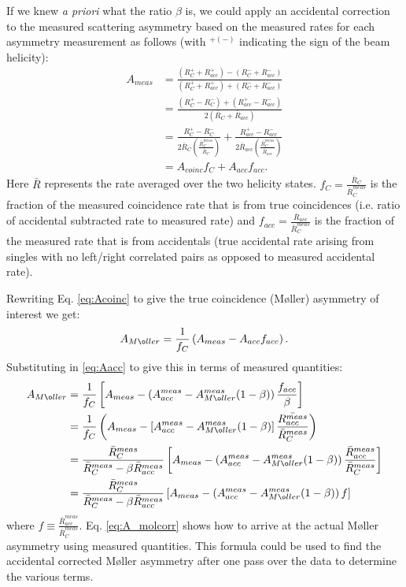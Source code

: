 \documentclass[12pt]{article}
\begin{document}
If we knew {\it a priori} what the ratio $\beta$ is, we could apply an accidental correction to the measured scattering asymmetry based on the measured rates for each asymmetry measurement as follows (with $^{+(-)}$ indicating the sign of the beam helicity):
\begin{align}
A_{meas}&=\frac{(R_C^{+}+R_{acc}^{+})-(R_C^{-}+R_{acc}^{-})}{(R_C^{+}+R_{acc}^{+})+(R_C^{-}+R_{acc}^{-})}\label{eq:Araw}\\
&=\frac{(R_C^{+}-R_{C}^{-})+(R_{acc}^{+}-R_{acc}^{-})}{2(\bar{R}_C+\bar{R}_{acc})}\\
&=\frac{R_C^{+}-R_{C}^{-}}{2\bar{R}_C\left(\frac{\bar{R}_C^{meas}}{\bar{R}_C}\right)}+\frac{R_{acc}^{+}- R_{acc}^{-}}{2\bar{R}_{acc}\left(\frac{\bar{R}_C^{meas}}{\bar{R}_{acc}}\right)}\\
&=A_{coinc}f_C+A_{acc}f_{acc}.\label{eq:Acoinc}
\end{align}
Here $\bar{R}$ represents the rate averaged over the two helicity states. $f_C=\frac{\bar{R}_C}{\bar{R}_C^{meas}}$ is the fraction of the measured coincidence rate that is from true coincidences (i.e. ratio of accidental subtracted rate to measured rate) and $f_{acc}=\frac{\bar{R}_{acc}}{\bar{R}_C^{meas}}$ is the fraction of the measured rate that is from accidentals (true accidental rate arising from singles with no left/right correlated pairs as opposed to measured accidental rate).

Rewriting Eq. \ref{eq:Acoinc} to give the true coincidence (M\o ller) asymmetry of interest we get:
\[
A_{M\o ller}=\frac{1}{f_C}\left(A_{meas}-A_{acc}f_{acc}\right).
\]
Substituting in \ref{eq:Aacc} to give this in terms of measured quantities:
\begin{align}
A_{M\o ller}&=\frac{1}{f_C}\left[A_{meas}-\left(A_{acc}^{meas}-A_{M\o ller}^{meas}(1-\beta)\right)\frac{f_{acc}}{\beta}\right]\\
&=\frac{1}{f_C}\left(A_{meas}-\left[A_{acc}^{meas}-A_{M\o ller}^{meas}(1-\beta)\right]\frac{\bar{R_{acc}^{meas}}}{\bar{R}_C^{meas}}\right)\\
&=\frac{\bar{R}_C^{meas}}{\bar{R}_C^{meas}-\beta\bar{R}_{acc}^{meas}}\left[A_{meas}-\left(A_{acc}^{meas}-A_{M\o ller}^{meas}(1-\beta)\right)\frac{\bar{R}_{acc}^{meas}}{\bar{R}_C^{meas}}\right]\\
&=\frac{\bar{R}_C^{meas}}{\bar{R}_C^{meas}-\beta\bar{R}_{acc}^{meas}}\left[A_{meas}-\left(A_{acc}^{meas}-A_{M\o ller}^{meas}(1-\beta)\right)f\right]\label{eq:A_molcorr}
\end{align}
where $f\equiv\frac{\bar{R}_{acc}^{meas}}{\bar{R}_C^{meas}}$. Eq. \ref{eq:A_molcorr} shows how to arrive at the actual M\o ller asymmetry using measured quantities. This formula could be used to find the accidental corrected M\o ller asymmetry after one pass over the data to determine the various terms. 
\end{document}
